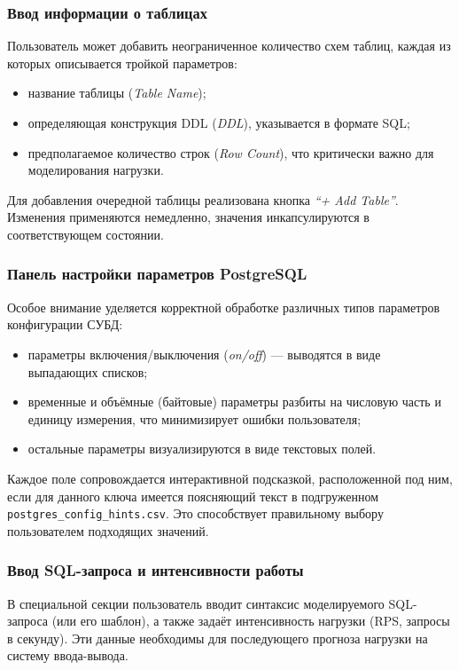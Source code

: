 \subsubsection{Ввод информации о таблицах}

Пользователь может добавить неограниченное количество схем таблиц, каждая из которых описывается тройкой параметров:
\begin{itemize}
    \item название таблицы (\emph{Table Name});
    \item определяющая конструкция DDL (\emph{DDL}), указывается в формате SQL;
    \item предполагаемое количество строк (\emph{Row Count}), что критически важно для моделирования нагрузки.
\end{itemize}
Для добавления очередной таблицы реализована кнопка \emph{``+ Add Table''}. Изменения применяются немедленно, значения инкапсулируются в соответствующем состоянии.

\subsubsection{Панель настройки параметров PostgreSQL}

Особое внимание уделяется корректной обработке различных типов параметров конфигурации СУБД:
\begin{itemize}
    \item параметры включения/выключения (\emph{on/off}) --- выводятся в виде выпадающих списков;
    \item временные и объёмные (байтовые) параметры разбиты на числовую часть и единицу измерения, что минимизирует ошибки пользователя;
    \item остальные параметры визуализируются в виде текстовых полей.
\end{itemize}

Каждое поле сопровождается интерактивной подсказкой, расположенной под ним, если для данного ключа имеется поясняющий текст в подгруженном \texttt{postgres\_config\_hints.csv}. Это способствует правильному выбору пользователем подходящих значений.

\subsubsection{Ввод SQL-запроса и интенсивности работы}

В специальной секции пользователь вводит синтаксис моделируемого SQL-запроса (или его шаблон), а также задаёт интенсивность нагрузки (RPS, запросы в секунду). Эти данные необходимы для последующего прогноза нагрузки на систему ввода-вывода.

